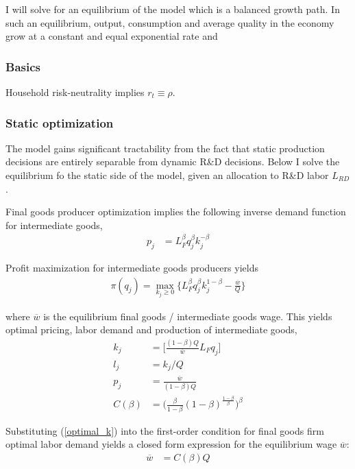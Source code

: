 \documentclass[11pt,english]{article}
\theoremstyle{remark}
\begin{document}
I will solve for an equilibrium of the model which is a balanced growth path. In such an equilibrium, output, consumption and average quality in the economy grow at a constant and equal exponential rate and 

\subsubsection{Basics}

Household risk-neutrality implies $r_t \equiv \rho$.

\subsubsection{Static optimization}

The model gains significant tractability from the fact that static production decisions are entirely separable from dynamic R\&D decisions. Below I solve the equilibrium fo the static side of the model, given an allocation to R\&D labor $L_{RD}$. 

Final goods producer optimization implies the following inverse demand function for intermediate goods, 
\begin{align*}
	p_j &= L_F^{\beta} q_j^{\beta} k_j^{-\beta}	
\end{align*}

Profit maximization for intermediate goods producers yields
\begin{align}
\pi(q_j) = \max_{k_j \ge 0} \Big\{ L_F^{\beta} q_j^{\beta} k_j^{1-\beta} - \frac{\overline{w}}{Q} \Big\} \label{incumbent_profit}
\end{align}

where $\overline{w}$ is the equilibrium final goods / intermediate goods wage.
This yields optimal pricing, labor demand and production of intermediate goods,
\begin{align}
k_j &= \Big[ \frac{(1-\beta) Q}{\overline{w}} L_F q_j  \Big] \label{optimal_k}\\
l_j &= k_j / Q \label{optimal_l}\\
p_j &= \frac{\overline{w}}{(1-\beta) Q} \label{optimal_p}\\
C(\beta) &= \Big(\frac{\beta}{1-\beta} (1-\beta)^{\frac{1-\beta}{\beta}} \Big)^{\beta} \label{def_cbeta}
\end{align}

Substituting (\ref{optimal_k}) into the first-order condition for final goods firm optimal labor demand yields a closed form expression for the equilibrium wage $\overline{w}$:
\begin{align}
	\overline{w} &= C(\beta) Q \label{wbar}
\end{align}
\end{document}
